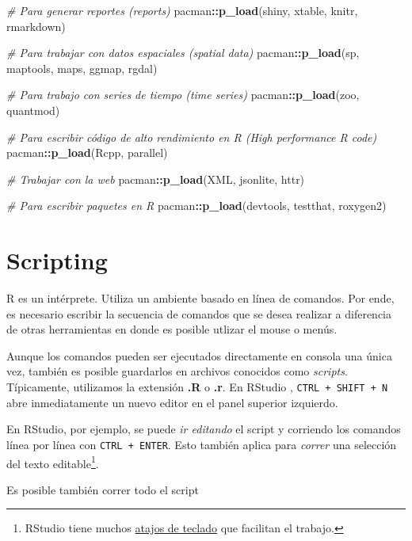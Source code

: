 \documentclass[]{article}
\newenvironment{Shaded}{\begin{snugshade}}{\end{snugshade}}
\newcommand{\KeywordTok}[1]{\textcolor[rgb]{0.13,0.29,0.53}{\textbf{#1}}}
\newcommand{\CommentTok}[1]{\textcolor[rgb]{0.56,0.35,0.01}{\textit{#1}}}
\newcommand{\OperatorTok}[1]{\textcolor[rgb]{0.81,0.36,0.00}{\textbf{#1}}}
\newcommand{\NormalTok}[1]{#1}
\let\rmarkdownfootnote\footnote%
\def\footnote{\protect\rmarkdownfootnote}
\begin{document}
\begin{Shaded}
\begin{Highlighting}[]
\CommentTok{# Para generar reportes (reports)}
\NormalTok{pacman}\OperatorTok{::}\KeywordTok{p_load}\NormalTok{(shiny, xtable, knitr, rmarkdown)}

\CommentTok{# Para trabajar con datos espaciales (spatial data)}
\NormalTok{pacman}\OperatorTok{::}\KeywordTok{p_load}\NormalTok{(sp, maptools, maps, ggmap, rgdal)}

\CommentTok{# Para trabajo con series de tiempo (time series)}
\NormalTok{pacman}\OperatorTok{::}\KeywordTok{p_load}\NormalTok{(zoo, quantmod)}

\CommentTok{# Para escribir código de alto rendimiento en R (High performance R code)}
\NormalTok{pacman}\OperatorTok{::}\KeywordTok{p_load}\NormalTok{(Rcpp, parallel)}

\CommentTok{# Trabajar con la web }
\NormalTok{pacman}\OperatorTok{::}\KeywordTok{p_load}\NormalTok{(XML, jsonlite, httr)}

\CommentTok{# Para escribir paquetes en R}
\NormalTok{pacman}\OperatorTok{::}\KeywordTok{p_load}\NormalTok{(devtools, testthat, roxygen2)}
\end{Highlighting}
\end{Shaded}

\section{Scripting}\label{scripting}

R es un intérprete. Utiliza un ambiente basado en línea de comandos. Por
ende, es necesario escribir la secuencia de comandos que se desea
realizar a diferencia de otras herramientas en donde es posible utlizar
el mouse o menús.

Aunque los comandos pueden ser ejecutados directamente en consola una
única vez, también es posible guardarlos en archivos conocidos como
\emph{scripts}. Típicamente, utilizamos la extensión \textbf{.R} o
\textbf{.r}. En RStudio \parencite{rstudio},
\texttt{CTRL\ +\ SHIFT\ +\ N} abre inmediatamente un nuevo editor en el
panel superior izquierdo.

En RStudio, por ejemplo, se puede \emph{ir editando} el script y
corriendo los comandos línea por línea con \texttt{CTRL\ +\ ENTER}. Esto
también aplica para \emph{correr} una selección del texto
editable\footnote{RStudio tiene muchos
  \href{https://support.rstudio.com/hc/en-us/articles/200711853-Keyboard-Shortcuts}{atajos
  de teclado} que facilitan el trabajo.}.

Es posible también correr todo el script
\end{document}
